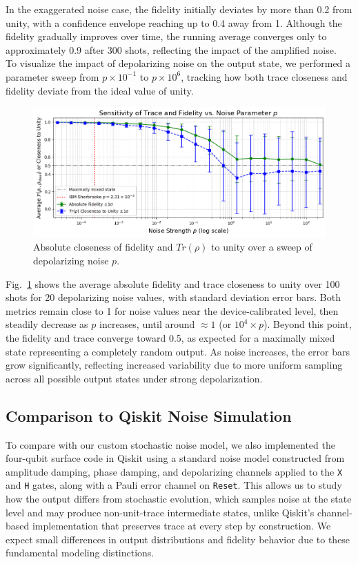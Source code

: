 \documentclass[9pt,a4paper,twocolumn,twoside]{tau-class/tau}
\begin{document}
In the exaggerated noise case, the fidelity initially deviates by more than 0.2 from unity, with a confidence envelope reaching up to 0.4 away from 1. Although the fidelity gradually improves over time, the running average converges only to approximately 0.9 after 300 shots, reflecting the impact of the amplified noise.\\
To visualize the impact of depolarizing noise on the output state, we performed a parameter sweep from \( p \times 10^{-1} \) to \( p \times 10^{6} \), tracking how both trace closeness and fidelity deviate from the ideal value of unity.

\begin{figure}[H]
    \centering
        \includegraphics[width=1\linewidth]{figures/F_Trace_over_p.png} 
    \caption{Absolute closeness of fidelity and \(Tr(\rho)\) to unity over a sweep of depolarizing noise \(p\).}
    \label{fig:p_sweep_F_and_Tr}
\end{figure}

Fig.~\ref{fig:p_sweep_F_and_Tr} shows the average absolute fidelity and trace closeness to unity over 100 shots for 20 depolarizing noise values, with standard deviation error bars. Both metrics remain close to 1 for noise values near the device-calibrated level, then steadily decrease as \( p \) increases, until around \( \approx 1 \) (or \( 10^4 \times p \)). Beyond this point, the fidelity and trace converge toward 0.5, as expected for a maximally mixed state representing a completely random output. As noise increases, the error bars grow significantly, reflecting increased variability due to more uniform sampling across all possible output states under strong depolarization.


\subsection{Comparison to Qiskit Noise Simulation}
To compare with our custom stochastic noise model, we also implemented the four-qubit surface code in Qiskit using a standard noise model constructed from amplitude damping, phase damping, and depolarizing channels applied to the \texttt{X} and \texttt{H} gates, along with a Pauli error channel on \texttt{Reset}. This allows us to study how the output differs from stochastic evolution, which samples noise at the state level and may produce non-unit-trace intermediate states, unlike Qiskit's channel-based implementation that preserves trace at every step by construction. We expect small differences in output distributions and fidelity behavior due to these fundamental modeling distinctions.
\end{document}
